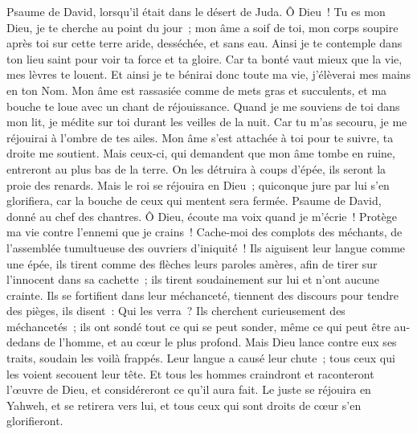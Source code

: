 \begin{multicols}{2}
\VerseOne{}Psaume de David, lorsqu'il était dans le désert de Juda.
Ô Dieu~! Tu es mon Dieu, je te cherche au point du jour~; mon âme a soif de toi, mon corps soupire après toi sur cette terre aride, desséchée, et sans eau.
Ainsi je te contemple dans ton lieu saint pour voir ta force et ta gloire.
Car ta bonté vaut mieux que la vie, mes lèvres te louent.
Et ainsi je te bénirai donc toute ma vie, j'élèverai mes mains en ton Nom.
Mon âme est rassasiée comme de mets gras et succulents, et ma bouche te loue avec un chant de réjouissance.
Quand je me souviens de toi dans mon lit, je médite sur toi durant les veilles de la nuit.
Car tu m'as secouru, je me réjouirai à l'ombre de tes ailes.
Mon âme s'est attachée à toi pour te suivre, ta droite me soutient.
Mais ceux-ci, qui demandent que mon âme tombe en ruine, entreront au plus bas de la terre.
On les détruira à coups d'épée, ils seront la proie des renards.
Mais le roi se réjouira en Dieu~; quiconque jure par lui s'en glorifiera, car la bouche de ceux qui mentent sera fermée.
\VerseOne{}Psaume de David, donné au chef des chantres.
Ô Dieu, écoute ma voix quand je m'écrie~! Protège ma vie contre l'ennemi que je crains~!
Cache-moi des complots des méchants, de l'assemblée tumultueuse des ouvriers d'iniquité~!
Ils aiguisent leur langue comme une épée, ils tirent comme des flèches leurs paroles amères,
afin de tirer sur l'innocent dans sa cachette~; ils tirent soudainement sur lui et n'ont aucune crainte.
Ils se fortifient dans leur méchanceté, tiennent des discours pour tendre des pièges, ils disent~: Qui les verra~?
Ils cherchent curieusement des méchancetés~; ils ont sondé tout ce qui se peut sonder, même ce qui peut être au-dedans de l'homme, et au cœur le plus profond.
Mais Dieu lance contre eux ses traits, soudain les voilà frappés.
Leur langue a causé leur chute~; tous ceux qui les voient secouent leur tête.
Et tous les hommes craindront et raconteront l'œuvre de Dieu, et considéreront ce qu'il aura fait.
Le juste se réjouira en Yahweh, et se retirera vers lui, et tous ceux qui sont droits de cœur s'en glorifieront.

\end{multicols}
